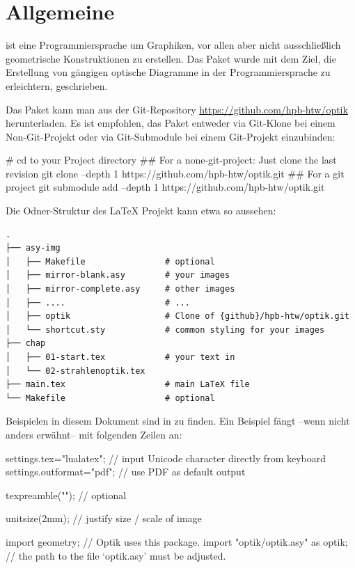\chapter{Allgemeine}

\asypmtote\cite{Asymptote} ist eine Programmiersprache um Graphiken, vor allen aber nicht ausschließlich geometrische Konstruktionen zu erstellen.
Das Paket \optik{} wurde mit dem Ziel, die Erstellung von gängigen optische Diagramme in der Programmiersprache \asypmtote{} zu erleichtern, geschrieben.

Das Paket kann man aus der Git-Repository \url{https://github.com/hpb-htw/optik} herunterladen.
Es ist empfohlen, das Paket entweder via Git-Klone bei einem Non-Git-Projekt oder via Git-Submodule bei einem Git-Projekt einzubinden:

\begin{shellcode}
#  cd to your Project directory
## For a none-git-project: Just clone the last revision
git clone --depth 1 https://github.com/hpb-htw/optik.git
## For a git project
git submodule add --depth 1 https://github.com/hpb-htw/optik.git
\end{shellcode}

Die Odner-Struktur des \LaTeX{} Projekt kann etwa so aussehen:

\begin{verbatim}
.
├── asy-img
│   ├── Makefile                # optional
│   ├── mirror-blank.asy        # your images
│   ├── mirror-complete.asy     # other images
│   ├── ....                    # ...
│   ├── optik                   # Clone of {github}/hpb-htw/optik.git
│   └── shortcut.sty            # common styling for your images
├── chap
│   ├── 01-start.tex            # your text in
│   └── 02-strahlenoptik.tex
├── main.tex                    # main LaTeX file
└── Makefile                    # optional
\end{verbatim}

Beispielen in diesem Dokument sind in \repo{} zu finden. 
Ein Beispiel fängt --wenn nicht anders erwähnt-- mit folgenden Zeilen an:

\begin{asycode}
settings.tex="lualatex";  // input Unicode character directly from keyboard
settings.outformat="pdf"; // use PDF as default output

texpreamble(""); // optional

unitsize(2mm);                       // justify size / scale of image

import geometry;                     // Optik uses this package.
import "optik/optik.asy" as optik;   // the path to the file `optik.asy' must be adjusted.
\end{asycode}


